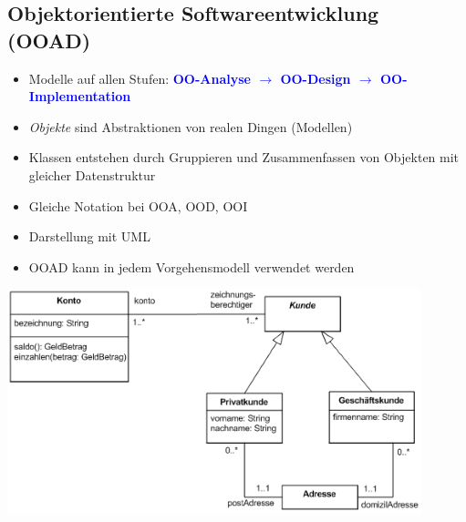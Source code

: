 \subsection{Objektorientierte Softwareentwicklung (OOAD)}
\begin{minipage}[b]{13cm}
	\begin{itemize}
		\item Modelle auf allen Stufen:\textcolor{blue}{\textbf{ OO-Analyse $\rightarrow$ OO-Design $\rightarrow$ OO-Implementation}}
		\item \textit{Objekte} sind Abstraktionen von realen Dingen (Modellen)
		\item Klassen entstehen durch Gruppieren und Zusammenfassen von Objekten mit gleicher Datenstruktur
		\item Gleiche Notation bei OOA, OOD, OOI
		\item Darstellung mit UML
		\item OOAD kann in jedem Vorgehensmodell verwendet werden
	\end{itemize}
	\vspace{1pt}
\end{minipage}
\newline
\includegraphics[width=12cm]{images/uml.png}

